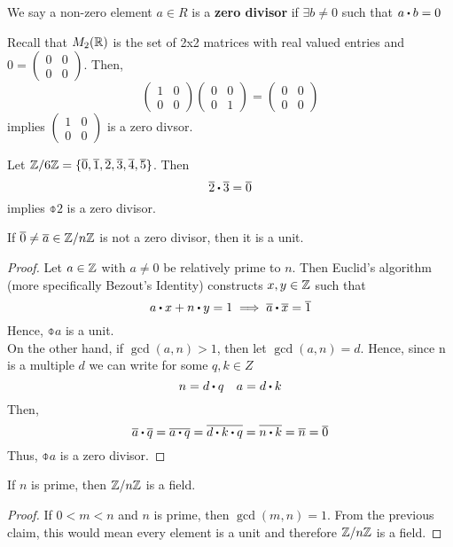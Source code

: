\documentclass[../Main.tex]{subfiles}
\begin{document}
\begin{dfn}[title=Zero Divisor]
	We say a non-zero element $a\in R$ is a \textbf{zero divisor} if $\exists b \ne 0$ such that $a\rdot b=0$
\end{dfn}
\begin{example}
	Recall that $M_2(\mathbb{R})$ is the set of 2x2 matrices with real valued entries and $0 = \begin{pmatrix}
		0&0\\0&0
	\end{pmatrix}$. Then,
	\[\begin{pmatrix}
	1&0\\0&0
	\end{pmatrix}\begin{pmatrix}
	0&0\\0&1
	\end{pmatrix}=\begin{pmatrix}
	0&0\\0&0
	\end{pmatrix}\]
	implies $\begin{pmatrix}
	1&0\\0&0
	\end{pmatrix}$ is a zero divsor.
\end{example}
\begin{example}
	Let $\mathbb{Z}/6\mathbb{Z} = \{\overline{0},\overline{1},\overline{2},\overline{3},\overline{4},\overline{5} \}$. Then
	\[\obar{2}\rdot \obar{3} = \obar{0} \]
	implies $\obar{2}$ is a zero divisor.
\end{example}
\begin{claim}
	If $\overline{0}\ne\overline{a}\in \mathbb{Z}/n\mathbb{Z}$ is not a zero divisor, then it is a unit.
\end{claim}
\begin{proof}
	Let $a\in\mathbb{Z}$ with $a\ne0$ be relatively prime to $n$. Then Euclid's algorithm (more specifically Bezout's Identity) constructs $x,y\in \mathbb{Z}$ such that\
	\[a\rdot x+n\rdot y=1 \implies \obar{a}\rdot \obar{x}=\obar{1}\]
	Hence, $\obar{a}$ is a unit.\\
	On the other hand, if $\gcd(a,n)>1$, then let $\gcd(a,n)=d$. Hence, since n is a multiple $d$ we can write for some $q,k\in Z$
	\[n=d\rdot q \quad a = d\rdot k\]
	Then,
	\[\obar{a}\rdot \obar{q}=\obar{a\rdot q}= \obar{d\rdot k\rdot q} = \obar{n \rdot k}=\obar{n}=\obar{0}\] 
	Thus, $\obar{a}$ is a zero divisor.
\end{proof}
\begin{crl}{}{}
	If $n$ is prime, then $\mathbb{Z}/n\mathbb{Z}$ is a field.
\end{crl}
\begin{proof}
	If $0<m<n$ and $n$ is prime, then $\gcd(m,n)=1$. From the previous claim, this would mean every element is a unit and therefore $\mathbb{Z}/n\mathbb{Z}$ is a field.
\end{proof}
\end{document}
